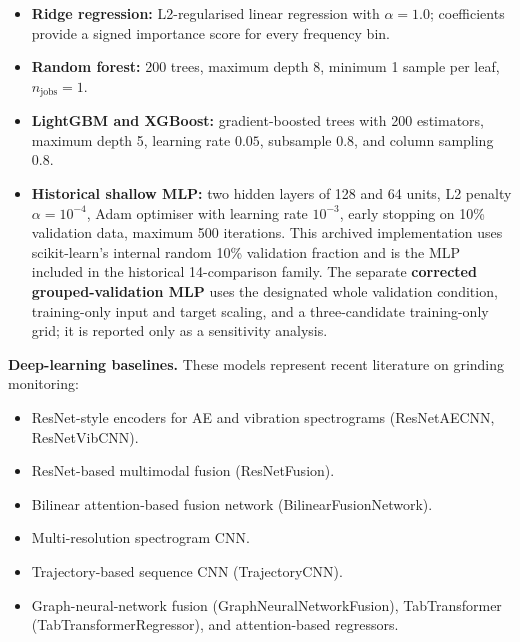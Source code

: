 \begin{itemize}
\tightlist
\item
  \textbf{Ridge regression:} L2-regularised linear regression with
  $\alpha=1.0$; coefficients provide a signed importance score for every
  frequency bin.
\item
  \textbf{Random forest:} 200 trees, maximum depth 8, minimum 1 sample
  per leaf, $n_{\text{jobs}}=1$.
\item
  \textbf{LightGBM and XGBoost:} gradient-boosted trees with 200
  estimators, maximum depth 5, learning rate $0.05$, subsample
  $0.8$, and column sampling $0.8$.
\item
  \textbf{Historical shallow MLP:} two hidden layers of 128 and 64 units, L2
  penalty $\alpha=10^{-4}$, Adam optimiser with learning rate
  $10^{-3}$, early stopping on 10\% validation data, maximum 500
  iterations. This archived implementation uses scikit-learn's internal
  random 10\% validation fraction and is the MLP included in the historical
  14-comparison family. The separate \textbf{corrected grouped-validation
  MLP} uses the designated whole validation condition, training-only input
  and target scaling, and a three-candidate training-only grid; it is reported
  only as a sensitivity analysis.
\end{itemize}

\textbf{Deep-learning baselines.} These models represent recent
literature on grinding monitoring:

\begin{itemize}
\tightlist
\item
  ResNet-style encoders for AE and vibration spectrograms
  (ResNetAECNN, ResNetVibCNN).
\item
  ResNet-based multimodal fusion (ResNetFusion).
\item
  Bilinear attention-based fusion network (BilinearFusionNetwork).
\item
  Multi-resolution spectrogram CNN.
\item
  Trajectory-based sequence CNN (TrajectoryCNN).
\item
  Graph-neural-network fusion (GraphNeuralNetworkFusion), TabTransformer (TabTransformerRegressor), and attention-based
  regressors.
\end{itemize}

